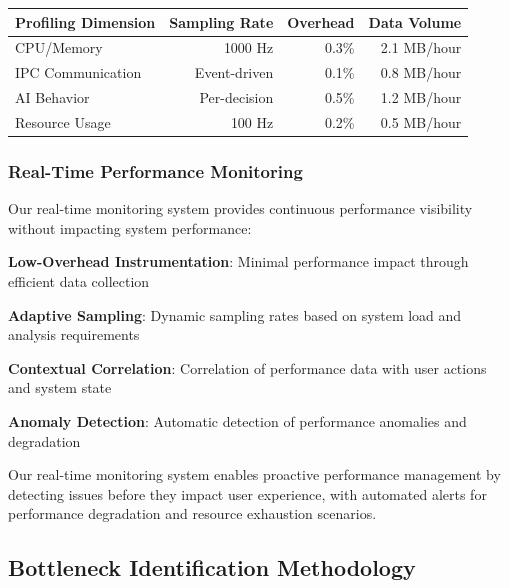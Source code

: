 \begin{center}
\begin{tabular}{@{}lrrr@{}}
\toprule
\textbf{Profiling Dimension} & \textbf{Sampling Rate} & \textbf{Overhead} & \textbf{Data Volume} \\
\midrule
CPU/Memory & 1000 Hz & 0.3\% & 2.1 MB/hour \\
IPC Communication & Event-driven & 0.1\% & 0.8 MB/hour \\
AI Behavior & Per-decision & 0.5\% & 1.2 MB/hour \\
Resource Usage & 100 Hz & 0.2\% & 0.5 MB/hour \\
\bottomrule
\end{tabular}
\end{center}

\subsubsection*{Real-Time Performance Monitoring}

Our real-time monitoring system provides continuous performance visibility without impacting system performance:

\begin{compactlist}
    \item \textbf{Low-Overhead Instrumentation}: Minimal performance impact through efficient data collection
    \item \textbf{Adaptive Sampling}: Dynamic sampling rates based on system load and analysis requirements
    \item \textbf{Contextual Correlation}: Correlation of performance data with user actions and system state
    \item \textbf{Anomaly Detection}: Automatic detection of performance anomalies and degradation
\end{compactlist}

\begin{infobox}[title=Real-Time Monitoring Benefits]
Our real-time monitoring system enables proactive performance management by detecting issues before they impact user experience, with automated alerts for performance degradation and resource exhaustion scenarios.
\end{infobox}

\subsection*{Bottleneck Identification Methodology}

